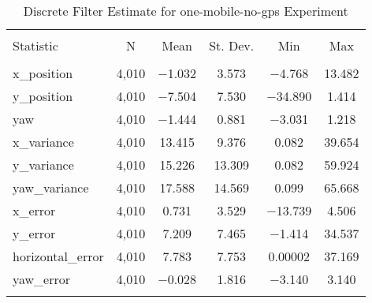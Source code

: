 
\begin{table}[h] \centering 
  \caption{Discrete Filter Estimate for one-mobile-no-gps Experiment} 
  \label{tab:one_mobile_no_gps_discrete_summary} 
\begin{tabular}{@{\extracolsep{5pt}}lccccc} 
\\[-1.8ex]\hline 
\hline \\[-1.8ex] 
Statistic & \multicolumn{1}{c}{N} & \multicolumn{1}{c}{Mean} & \multicolumn{1}{c}{St. Dev.} & \multicolumn{1}{c}{Min} & \multicolumn{1}{c}{Max} \\ 
\hline \\[-1.8ex] 
x\_position & 4,010 & $-$1.032 & 3.573 & $-$4.768 & 13.482 \\ 
y\_position & 4,010 & $-$7.504 & 7.530 & $-$34.890 & 1.414 \\ 
yaw & 4,010 & $-$1.444 & 0.881 & $-$3.031 & 1.218 \\ 
x\_variance & 4,010 & 13.415 & 9.376 & 0.082 & 39.654 \\ 
y\_variance & 4,010 & 15.226 & 13.309 & 0.082 & 59.924 \\ 
yaw\_variance & 4,010 & 17.588 & 14.569 & 0.099 & 65.668 \\ 
x\_error & 4,010 & 0.731 & 3.529 & $-$13.739 & 4.506 \\ 
y\_error & 4,010 & 7.209 & 7.465 & $-$1.414 & 34.537 \\ 
horizontal\_error & 4,010 & 7.783 & 7.753 & 0.00002 & 37.169 \\ 
yaw\_error & 4,010 & $-$0.028 & 1.816 & $-$3.140 & 3.140 \\ 
\hline \\[-1.8ex] 
\end{tabular} 
\end{table} 
